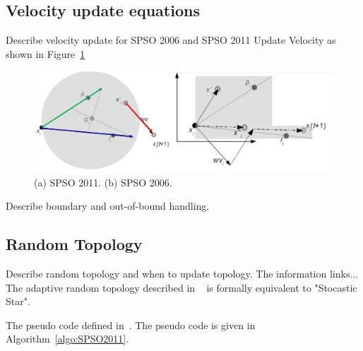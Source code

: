 \subsection{Velocity update equations}

Describe velocity update for SPSO 2006 and SPSO 2011
Update Velocity as shown in Figure~\ref{fig:SPSO_update}
\begin{figure}
\centering
\includegraphics[width=\textwidth]{SPSO_update}
\caption{(a) SPSO 2011. (b) SPSO 2006.}\label{fig:SPSO_update}
\end{figure}

Describe boundary and out-of-bound handling.

\subsection{Random Topology}
Describe random topology and when to update topology.
The information links...  The adaptive random topology described in ~\cite{Clerc:2007:randomTopology} is formally equivalent to "Stocastic Star".



The pseudo code defined in~\cite{Zambrano:2013:SPSO2011}.
The pseudo code is given in Algorithm~\ref{algo:SPSO2011}.



